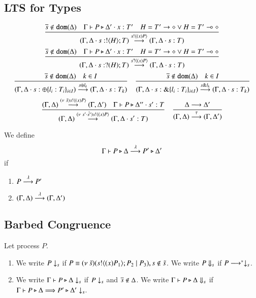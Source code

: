 \subsection{LTS for Types}

\[
\begin{array}{c}
	\tree{
		\dual{s} \notin \dom{\Delta} \quad \Gamma \proves P \hastype \Delta' \cat x: T' \quad H = \shot{T'} \vee H = \lhot{T'}
	}{
		(\Gamma, \Delta \cat s: \btout{H} T) \by{\bactout{s}{\abs{x}{P}}} (\Gamma, \Delta \cat s: T)
	}
	\\[6mm]
	\tree{
		\dual{s} \notin \dom{\Delta} \quad  \Gamma \proves P \hastype \Delta' \cat x: T' \quad H = \shot{T'} \vee H = \lhot{T'}
	}{
		(\Gamma, \Delta \cat s: \btinp{H} T) \by{\bactinp{s}{\abs{x}{P}}} (\Gamma, \Delta \cat s:T)
	}
	\\[6mm]
	\tree{
		\dual{s} \notin \dom{\Delta} \quad k \in I
	}{
		(\Gamma, \Delta \cat s: \btsel{l_i: T_i}_{i \in I}) \by{\bactsel{s}{l_k}} (\Gamma, \Delta \cat s:T_k)
	}
	\quad
	\tree{
		\dual{s} \notin \dom{\Delta} \quad k \in I
	}{
		(\Gamma, \Delta \cat s: \btbra{l_i: T_i}_{i \in I}) \by{\bactbra{s}{l_k}} (\Gamma, \Delta \cat s:T_k)
	}
	\\[6mm]

	\tree{
		(\Gamma, \Delta) \by{\news{\tilde{s}} \bactout{s}{\abs{x} P}} (\Gamma, \Delta')	\quad \Gamma \proves P \hastype \Delta'' \cat s': T	
	}{
		(\Gamma, \Delta) \by{\news{s' \cat \tilde{s'}} \bactout{s}{\abs{x} P}} (\Gamma, \Delta \cat s': T)
	}
	\quad
	\tree{
		\Delta \red \Delta'
	}{
		(\Gamma, \Delta) \by{\tau} (\Gamma,\Delta')
	}
\end{array}
\]

\begin{definition}
	We define
	\[
		\Gamma \vdash P \triangleright \Delta \stackrel{\lambda}{\longrightarrow} P' \triangleright \Delta'
	\]
	if
	\begin{enumerate}
		\item	$P \stackrel{\lambda}{\longrightarrow} P'$
		\item	$(\Gamma, \Delta) \stackrel{\lambda}{\longrightarrow} (\Gamma, \Delta')$
	\end{enumerate}
\end{definition}

\subsection{Barbed Congruence}

\begin{definition}[Barbs]
	Let \dk{$\pHO$} process $P$.
	\begin{enumerate}
		\item	We write $P \downarrow_{s}$ if $P \equiv (\nu\ \tilde{s})(s ! \langle (x)P_1 \rangle ; P_2 \;|\; P_3), s \notin \tilde{s}$.
			We write $P \Downarrow_{s}$ if $P \longrightarrow^* \downarrow_{s}$.

		\item	We write $\Gamma \vdash P \triangleright \Delta \downarrow_{s}$ if $P \downarrow_{s}$ and $\overline{s} \notin \Delta$.
			We write $\Gamma \vdash P \triangleright \Delta \Downarrow_{s}$ if $\Gamma \vdash P \triangleright \Delta \stackrel{}{\Longrightarrow} P' \triangleright \Delta' \downarrow_{s}$.			
	\end{enumerate}
\end{definition}

